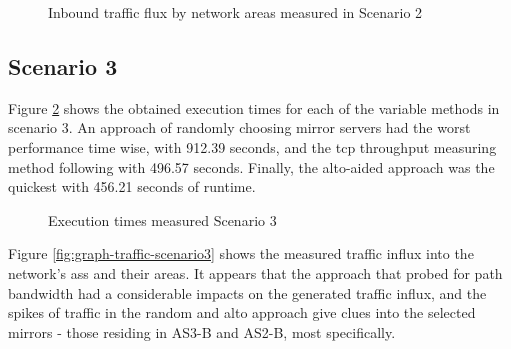 \begin{figure}[H]
\caption{Inbound traffic flux by network areas measured in Scenario 2}
\label{fig:graph-traffic-scenario2}
\end{figure}

\subsection{Scenario 3}

Figure \ref{fig:graph-execution-scenario3} shows the obtained execution times for each of the variable methods in scenario 3.
An approach of randomly choosing mirror servers had the worst performance time wise, with 912.39 seconds, and the \gls{tcp} throughput measuring method following with 496.57 seconds.
Finally, the \gls{alto}-aided approach was the quickest with 456.21 seconds of runtime.

\begin{figure}[H]
\centering
{} %
\caption{Execution times measured Scenario 3}
\label{fig:graph-execution-scenario3}
\end{figure}

Figure \ref{fig:graph-traffic-scenario3} shows the measured traffic influx into the network's \glspl{as} and their areas.
It appears that the approach that probed for path bandwidth had a considerable impacts on the generated traffic influx, and the spikes of traffic in the random and \gls{alto} approach give clues into the selected mirrors - those residing in AS3-B and AS2-B, most specifically.


